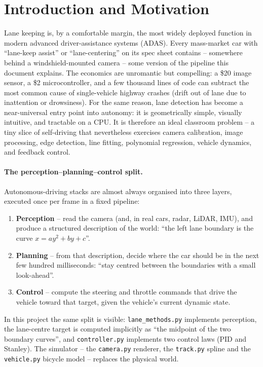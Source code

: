 
\section{Introduction and Motivation}
\label{sec:intro}

Lane keeping is, by a comfortable margin, the most widely deployed
function in modern advanced driver-assistance systems (ADAS). Every
mass-market car with ``lane-keep assist'' or ``lane-centering'' on its
spec sheet contains -- somewhere behind a windshield-mounted camera --
some version of the pipeline this document explains. The economics are
unromantic but compelling: a \$20 image sensor, a \$2 microcontroller,
and a few thousand lines of code can subtract the most common cause of
single-vehicle highway crashes (drift out of lane due to inattention or
drowsiness). For the same reason, lane detection has become a
near-universal entry point into autonomy: it is geometrically simple,
visually intuitive, and tractable on a CPU. It is therefore an ideal
classroom problem -- a tiny slice of self-driving that nevertheless
exercises camera calibration, image processing, edge detection, line
fitting, polynomial regression, vehicle dynamics, and feedback control.

\paragraph{The perception--planning--control split.}
Autonomous-driving stacks are almost always organised into three
layers, executed once per frame in a fixed pipeline:
\begin{enumerate}[leftmargin=2em,itemsep=2pt]
  \item \textbf{Perception} -- read the camera (and, in real cars,
        radar, LiDAR, IMU), and produce a structured description of the
        world: ``the left lane boundary is the curve $x = a y^2 + b y + c$''.
  \item \textbf{Planning} -- from that description, decide where the
        car should be in the next few hundred milliseconds: ``stay
        centred between the boundaries with a small look-ahead''.
  \item \textbf{Control} -- compute the steering and throttle commands
        that drive the vehicle toward that target, given the vehicle's
        current dynamic state.
\end{enumerate}
In this project the same split is visible: \texttt{lane\_methods.py}
implements perception, the lane-centre target is computed implicitly as
``the midpoint of the two boundary curves'', and \texttt{controller.py}
implements two control laws (PID and Stanley). The simulator -- the
\texttt{camera.py} renderer, the \texttt{track.py} spline and the
\texttt{vehicle.py} bicycle model -- replaces the physical world.

